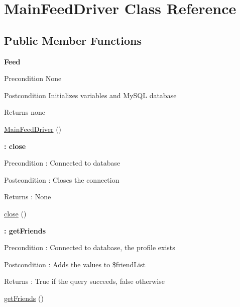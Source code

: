 \hypertarget{class_main_feed_driver}{}\section{Main\+Feed\+Driver Class Reference}
\label{class_main_feed_driver}
\subsection*{Public Member Functions}
\begin{Indent}{\bf Feed}\par
{\em \begin{DoxyPrecond}{Precondition}
None 
\end{DoxyPrecond}
\begin{DoxyPostcond}{Postcondition}
Initializes variables and My\+S\+QL database 
\end{DoxyPostcond}
\begin{DoxyReturn}{Returns}
none 
\end{DoxyReturn}
}\begin{DoxyCompactItemize}
\item 
\hyperlink{class_main_feed_driver_ae3f461041e7fbbdd57ec6a2b28ded882}{Main\+Feed\+Driver} ()
\end{DoxyCompactItemize}
\end{Indent}
\begin{Indent}{\bf \+: close}\par
{\em \begin{DoxyPrecond}{Precondition}
\+: Connected to database 
\end{DoxyPrecond}
\begin{DoxyPostcond}{Postcondition}
\+: Closes the connection 
\end{DoxyPostcond}
\begin{DoxyReturn}{Returns}
\+: None 
\end{DoxyReturn}
}\begin{DoxyCompactItemize}
\item 
\hyperlink{class_main_feed_driver_aa69c8bf1f1dcf4e72552efff1fe3e87e}{close} ()
\end{DoxyCompactItemize}
\end{Indent}
\begin{Indent}{\bf \+: get\+Friends}\par
{\em \begin{DoxyPrecond}{Precondition}
\+: Connected to database, the profile exists 
\end{DoxyPrecond}
\begin{DoxyPostcond}{Postcondition}
\+: Adds the values to \$friend\+List 
\end{DoxyPostcond}
\begin{DoxyReturn}{Returns}
\+: True if the query succeeds, false otherwise 
\end{DoxyReturn}
}\begin{DoxyCompactItemize}
\item 
\hyperlink{class_main_feed_driver_a3de379fa61951c3dc4436bd6c2f9cafc}{get\+Friends} ()
\end{DoxyCompactItemize}
\end{Indent}
